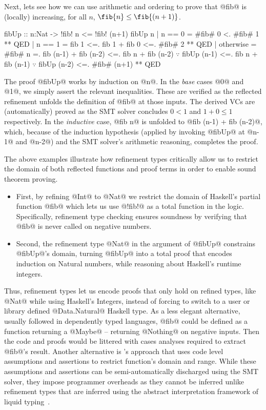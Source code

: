 %
Next, lets see how we can use arithmetic and
ordering to prove that @fib@ is (locally) increasing,
%
\ie for all $n$, $\fib{n} \leq \fib{(n+1)}$.
%
\begin{mcode}
    fibUp :: n:Nat -> { !fib! n <= !fib! (n+1) }
    fibUp n | n == 0
            =  #fib# 0 <. #fib# 1 ** QED
            | n == 1
            =  fib 1 <=. fib 1 + fib 0 <=. #fib# 2 ** QED
            | otherwise
            =  #fib# n
            =. fib (n-1) + fib (n-2)
            <=. fib n     + fib (n-2) $\because$ fibUp (n-1)
            <=. fib n     + fib (n-1) $\because$ fibUp (n-2)
            <=. #fib# (n+1) ** QED
\end{mcode} %

%
The proof @fibUp@ works by induction on @n@.
%
In the \emph{base} cases @0@ and @1@, we simply assert
the relevant inequalities. These are verified as the
reflected refinement unfolds the definition of
@fib@ at those inputs.
%
The derived VCs are (automatically) proved
as the SMT solver concludes $0 < 1$ and $1 + 0 \leq 1$
respectively.
%
In the \emph{inductive} case, @fib n@ is unfolded
to  @fib (n-1) + fib (n-2)@, which, because of the
induction hypothesis (applied by invoking @fibUp@
at @n-1@ and @n-2@) and the SMT solver's arithmetic
reasoning, completes the proof.

The above examples illustrate how refinement types
critically allow us to restrict the domain of both
reflected functions and proof terms in order to
enable sound theorem proving.
%
\begin{itemize}
  \item {}
  First, by refining @Int@ to @Nat@ we restrict
  the domain of Haskell's partial function @fib@
  which lets us use @!fib!@ as a total function in
  the logic. Specifically, refinement type checking
  ensures soundness by verifying that @fib@ is never
  called on negative numbers.
%
\item {}
  Second, the refinement type @Nat@
  in the argument of @fibUp@ constrains @fibUp@'s
  domain, turning @fibUp@ into a total proof that
  encodes induction on Natural numbers, while
  reasoning about Haskell's runtime integers.
\end{itemize}
%
Thus, refinement types let us encode proofs that
only hold on refined types, like @Nat@ while using
Haskell's Integers, instead of forcing to switch
to a user or library defined @Data.Natural@ Haskell
type.
%
As a less elegant alternative, usually followed
in dependently typed languages, @fib@ could be
defined as a function returning a @Maybe@ -- \ie
returning @Nothing@ on negative inputs.
Then the code and proofs would be littered with cases analyses
required to extract @fib@'s result.
%
Another alternative is \dafny's approach
that uses code level assumptions and assertions
to restrict function's domain and range.
%
While these assumptions and assertions can
be semi-automatically discharged using the
SMT solver, they impose programmer overheads
as they cannot be inferred unlike refinement
types that are inferred using
the abstract interpretation framework of
liquid typing~\cite{LiquidPLDI08}.


